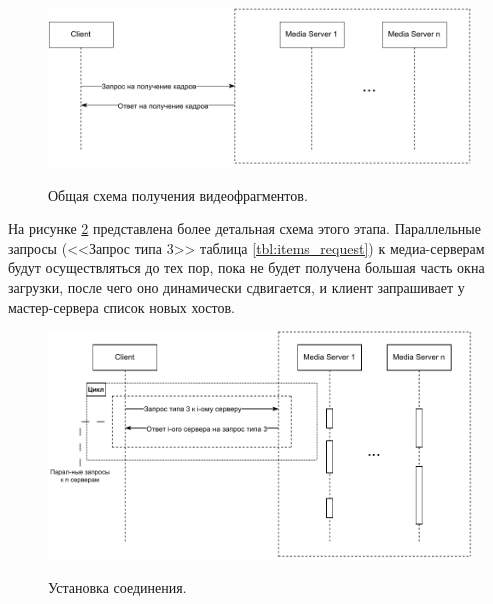 \begin{figure}[h!]
	\begin{center}
		{\includegraphics[scale = 1]{img/[general][media].pdf}}
		\caption{Общая схема получения видеофрагментов.}
		\label{image:general_upload}
	\end{center}
\end{figure}

На рисунке \ref{image:detailed_upload} представлена более детальная схема этого этапа. Параллельные запросы (<<Запрос типа 3>> таблица \ref{tbl:items_request}) к медиа-серверам будут осуществляться до тех пор, пока не будет получена большая часть окна загрузки, после чего оно динамически сдвигается, и клиент запрашивает у мастер-сервера список новых хостов. 

\begin{figure}[h!]
	\begin{center}
		{\includegraphics[scale = 1]{img/[items][media].pdf}}
		\caption{Установка соединения.}
		\label{image:detailed_upload}
	\end{center}
\end{figure}

